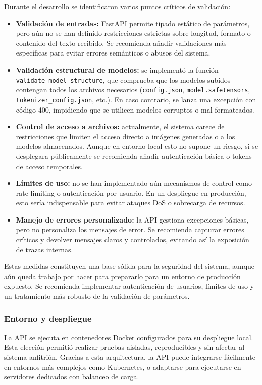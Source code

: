 Durante el desarrollo se identificaron varios puntos críticos de validación:

\begin{itemize}
    \item \textbf{Validación de entradas:} FastAPI permite tipado estático de parámetros, pero aún no se han definido restricciones estrictas sobre longitud, formato o contenido del texto recibido. Se recomienda añadir validaciones más específicas para evitar errores semánticos o abusos del sistema.
    \item \textbf{Validación estructural de modelos:} se implementó la función \texttt{validate\_model\_structure}, que comprueba que los modelos subidos contengan todos los archivos necesarios (\texttt{config.json}, \texttt{model.safetensors}, \texttt{tokenizer\_config.json}, etc.). En caso contrario, se lanza una excepción con código 400, impidiendo que se utilicen modelos corruptos o mal formateados.
    \item \textbf{Control de acceso a archivos:} actualmente, el sistema carece de restricciones que limiten el acceso directo a imágenes generadas o a los modelos almacenados. Aunque en entorno local esto no supone un riesgo, si se desplegara públicamente se recomienda añadir autenticación básica o tokens de acceso temporales.
    \item \textbf{Límites de uso:} no se han implementado aún mecanismos de control como rate limiting o autenticación por usuario. En un despliegue en producción, esto sería indispensable para evitar ataques DoS o sobrecarga de recursos.
    \item \textbf{Manejo de errores personalizado:} la API gestiona excepciones básicas, pero no personaliza los mensajes de error. Se recomienda capturar errores críticos y devolver mensajes claros y controlados, evitando así la exposición de trazas internas.
\end{itemize}

Estas medidas constituyen una base sólida para la seguridad del sistema, aunque aún queda trabajo por hacer para prepararlo para un entorno de producción expuesto. Se recomienda implementar autenticación de usuarios, límites de uso y un tratamiento más robusto de la validación de parámetros.

\subsubsection{Entorno y despliegue}

La API se ejecuta en contenedores Docker configurados para su despliegue local. Esta elección permitió realizar pruebas aisladas, reproducibles y sin afectar al sistema anfitrión. Gracias a esta arquitectura, la API puede integrarse fácilmente en entornos más complejos como Kubernetes, o adaptarse para ejecutarse en servidores dedicados con balanceo de carga.

